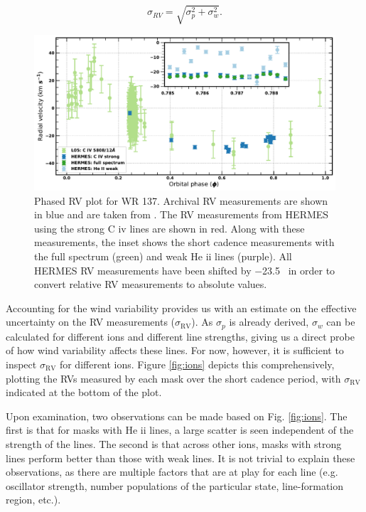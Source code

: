 \begin{equation}\label{eq:sig_RV}
\sigma_{RV} = \sqrt{\sigma_p^2 + \sigma_w^2} \textrm{.}
\end{equation}
\begin{figure}
    \centering
    \includegraphics[width=\hsize]{chapters/WC/image/WR137_shortcadence.pdf}
    \caption{Phased RV plot for WR 137. Archival RV measurements are shown in blue and are taken from \citet{lefevre_spectroscopic_2005}. The RV measurements from HERMES using the strong C {\sc iv} lines are shown in red. Along with these measurements, the inset shows the short cadence measurements with the full spectrum (green) and weak He {\sc ii} lines (purple). All HERMES RV measurements have been shifted by $-$23.5~\kms{} in order to convert relative RV measurements to absolute values.} 
    \label{fig:WR137_shortcadence}
\end{figure}
Accounting for the wind variability provides us with an estimate on the effective uncertainty on the RV measurements ($\sigma_\textrm{RV}$). As $\sigma_p$ is already derived, $\sigma_w$ can be calculated for different ions and different line strengths, giving us a direct probe of how wind variability affects these lines. For now, however, it is sufficient to inspect $\sigma_\textrm{RV}$ for different ions. Figure \ref{fig:ions} depicts this comprehensively, plotting the RVs measured by each mask over the short cadence period, with $\sigma_\textrm{RV}$ indicated at the bottom of the plot.

Upon examination, two observations can be made based on Fig. \ref{fig:ions}. The first is that for masks with He {\sc ii} lines, a large scatter is seen independent of the strength of the lines. The second is that across other ions, masks with strong lines perform better than those with weak lines. It is not trivial to explain these observations, as there are multiple factors that are at play for each line (e.g. oscillator strength, number populations of the particular state, line-formation region, etc.).


